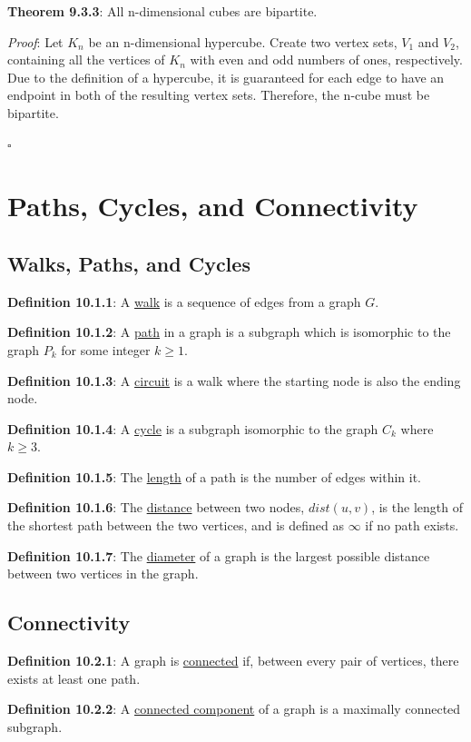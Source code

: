 \documentclass{article}
\newcommand{\separate}[1] {\vspace{#1 pt}\noindent}
\newcommand{\definition}[2]{\textbf{Definition #1}: #2\label{def:#1}}
\newcommand{\proof}[2]{\textit{Proof}: #2 \begin{flushright}\(\square\)\end{flushright}\label{prf:#1}}
\newcommand{\theorem}[3]{\textbf{Theorem #1}: #2 \par\separate{3}\proof{thm:#1}{#3}\label{thm:#1}}
\begin{document}
\separate{7}\theorem{9.3.3}{All n-dimensional cubes are bipartite.}{Let \(K_n\) be an n-dimensional hypercube. Create two vertex sets, \(V_1\) and \(V_2\), containing all the vertices of \(K_n\) with even and odd numbers of ones, respectively. Due to the definition of a hypercube, it is guaranteed for each edge to have an endpoint in both of the resulting vertex sets. Therefore, the n-cube must be bipartite.}

\section{Paths, Cycles, and Connectivity}

\subsection{Walks, Paths, and Cycles}

\definition{10.1.1}{A \underline{walk} is a sequence of edges from a graph \(G\).}

\separate{7}\definition{10.1.2}{A \underline{path} in a graph is a subgraph which is isomorphic to the graph \(P_k\) for some integer \(k \geq 1\).}

\separate{7}\definition{10.1.3}{A \underline{circuit} is a walk where the starting node is also the ending node.}

\separate{7}\definition{10.1.4}{A \underline{cycle} is a subgraph isomorphic to the graph \(C_k\) where \(k \geq 3\).}

\separate{7}\definition{10.1.5}{The \underline{length} of a path is the number of edges within it.}

\separate{7}\definition{10.1.6}{The \underline{distance} between two nodes, \(dist(u,v)\), is the length of the shortest path between the two vertices, and is defined as \(\infty\) if no path exists.}

\separate{7}\definition{10.1.7}{The \underline{diameter} of a graph is the largest possible distance between two vertices in the graph.}

\subsection{Connectivity}

\definition{10.2.1}{A graph is \underline{connected} if, between every pair of vertices, there exists at least one path.}

\separate{7}\definition{10.2.2}{A \underline{connected component} of a graph is a maximally connected subgraph.}
\end{document}

